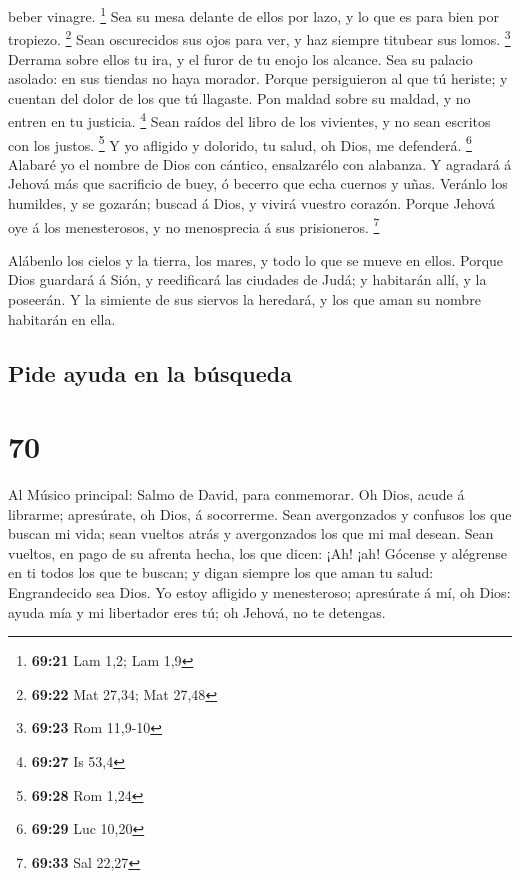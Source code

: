 beber vinagre. \footnote{\textbf{69:21} Lam 1,2; Lam 1,9} 
Sea su mesa delante de ellos por lazo, y lo que es para bien por
tropiezo. \footnote{\textbf{69:22} Mat 27,34; Mat 27,48} 
Sean oscurecidos sus ojos para ver, y haz siempre titubear sus lomos.
\footnote{\textbf{69:23} Rom 11,9-10}  Derrama sobre ellos
tu ira, y el furor de tu enojo los alcance.  Sea su palacio
asolado: en sus tiendas no haya morador.  Porque
persiguieron al que tú heriste; y cuentan del dolor de los que tú
llagaste.  Pon maldad sobre su maldad, y no entren en tu
justicia. \footnote{\textbf{69:27} Is 53,4}  Sean raídos
del libro de los vivientes, y no sean escritos con los justos.
\footnote{\textbf{69:28} Rom 1,24}  Y yo afligido y
dolorido, tu salud, oh Dios, me defenderá. \footnote{\textbf{69:29} Luc
  10,20}  Alabaré yo el nombre de Dios con cántico,
ensalzarélo con alabanza.  Y agradará á Jehová más que
sacrificio de buey, ó becerro que echa cuernos y uñas. 
Veránlo los humildes, y se gozarán; buscad á Dios, y vivirá vuestro
corazón.  Porque Jehová oye á los menesterosos, y no
menosprecia á sus prisioneros. \footnote{\textbf{69:33} Sal 22,27}

 Alábenlo los cielos y la tierra, los mares, y todo lo que
se mueve en ellos.  Porque Dios guardará á Sión, y
reedificará las ciudades de Judá; y habitarán allí, y la poseerán.
 Y la simiente de sus siervos la heredará, y los que aman
su nombre habitarán en ella.

\hypertarget{pide-ayuda-en-la-buxfasqueda}{%
\subsection{Pide ayuda en la
búsqueda}\label{pide-ayuda-en-la-buxfasqueda}}

\hypertarget{section-69}{%
\section{70}\label{section-69}}

 Al Músico principal: Salmo de David, para conmemorar. Oh
Dios, acude á librarme; apresúrate, oh Dios, á socorrerme. 
Sean avergonzados y confusos los que buscan mi vida; sean vueltos atrás
y avergonzados los que mi mal desean.  Sean vueltos, en pago
de su afrenta hecha, los que dicen: ¡Ah! ¡ah!  Gócense y
alégrense en ti todos los que te buscan; y digan siempre los que aman tu
salud: Engrandecido sea Dios.  Yo estoy afligido y
menesteroso; apresúrate á mí, oh Dios: ayuda mía y mi libertador eres
tú; oh Jehová, no te detengas.

